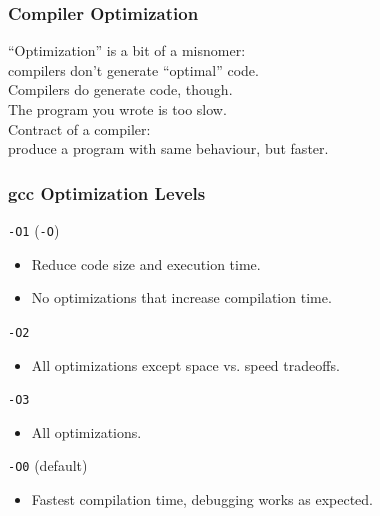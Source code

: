 \documentclass[aspectratio=43]{beamer}
\newenvironment{changemargin}[1]{%
  \begin{list}{}{%
    \setlength{\topsep}{0pt}%
    \setlength{\leftmargin}{#1}%
    \setlength{\rightmargin}{1em}
    \setlength{\listparindent}{\parindent}%
    \setlength{\itemindent}{\parindent}%
    \setlength{\parsep}{\parskip}%
  }%
  \item[]}{\end{list}}
\begin{document}
\begin{frame}
  \frametitle{Compiler Optimization}

  \begin{changemargin}{2cm}
    ``Optimization'' is a bit of a misnomer:\\
      \qquad compilers don't generate ``optimal'' code.\\[1em]

    Compilers do generate  code, though.\\[1em]

    The program you wrote is too slow. \\
    Contract of a compiler: \\
    \qquad produce a program with same behaviour, but faster.
  \end{changemargin}
\end{frame}

\begin{frame}
  \frametitle{gcc Optimization Levels}

  \begin{changemargin}{2cm}
  {\tt -O1} ({\tt -O})

  \begin{itemize}
    \item Reduce code size and execution time.
    \item No optimizations that increase compilation time.
  \end{itemize}

  {\tt -O2}

  \begin{itemize}
    \item All optimizations except space vs. speed tradeoffs.
  \end{itemize}
  
  {\tt -O3}

  \begin{itemize}
    \item All optimizations.
  \end{itemize}

  {\tt -O0} (default)

  \begin{itemize}
    \item Fastest compilation time, debugging works as expected.
  \end{itemize}
  \end{changemargin}
\end{frame}
\end{document}
